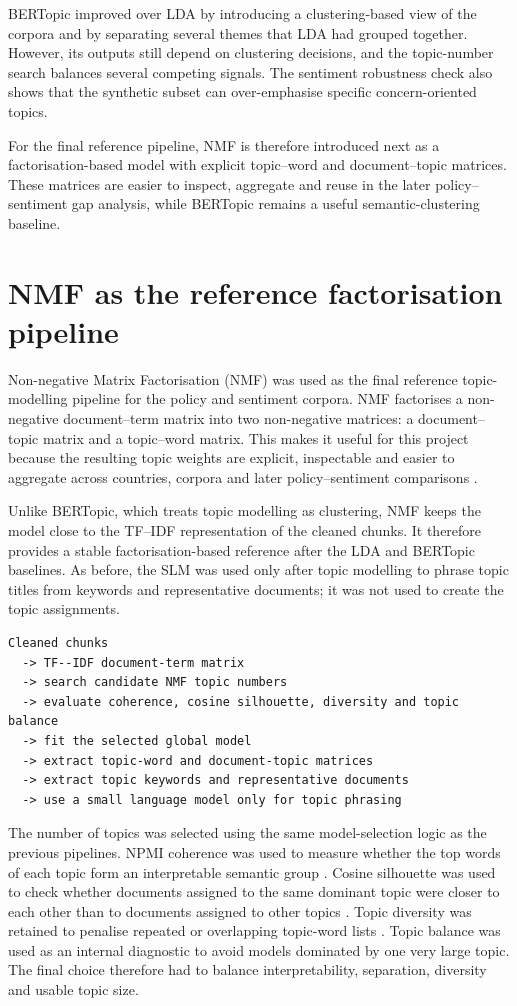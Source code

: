 \documentclass{article}
\begin{document}
BERTopic improved over LDA by introducing a clustering-based view of the corpora and
by separating several themes that LDA had grouped together. However, its outputs
still depend on clustering decisions, and the topic-number search balances several
competing signals. The sentiment robustness check also shows that the synthetic
subset can over-emphasise specific concern-oriented topics.

For the final reference pipeline, NMF is therefore introduced next as a
factorisation-based model with explicit topic--word and document--topic matrices.
These matrices are easier to inspect, aggregate and reuse in the later
policy--sentiment gap analysis, while BERTopic remains a useful semantic-clustering
baseline.


\section{NMF as the reference factorisation pipeline}

Non-negative Matrix Factorisation (NMF) was used as the final reference
topic-modelling pipeline for the policy and sentiment corpora. NMF factorises a
non-negative document--term matrix into two non-negative matrices: a document--topic
matrix and a topic--word matrix. This makes it useful for this project because the
resulting topic weights are explicit, inspectable and easier to aggregate across
countries, corpora and later policy--sentiment comparisons
\cite{lee1999learning,xu2003document}.

Unlike BERTopic, which treats topic modelling as clustering, NMF keeps the model
close to the TF--IDF representation of the cleaned chunks. It therefore provides a
stable factorisation-based reference after the LDA and BERTopic baselines. As before,
the SLM was used only after topic modelling to phrase topic titles from keywords and
representative documents; it was not used to create the topic assignments.

\begin{verbatim}
Cleaned chunks
  -> TF--IDF document-term matrix
  -> search candidate NMF topic numbers
  -> evaluate coherence, cosine silhouette, diversity and topic balance
  -> fit the selected global model
  -> extract topic-word and document-topic matrices
  -> extract topic keywords and representative documents
  -> use a small language model only for topic phrasing
\end{verbatim}

The number of topics was selected using the same model-selection logic as the
previous pipelines. NPMI coherence was used to measure whether the top words of each
topic form an interpretable semantic group \cite{roder2015exploring}. Cosine
silhouette was used to check whether documents assigned to the same dominant topic
were closer to each other than to documents assigned to other topics
\cite{rousseeuw1987silhouettes}. Topic diversity was retained to penalise repeated or
overlapping topic-word lists \cite{dieng2020topic}. Topic balance was used as an
internal diagnostic to avoid models dominated by one very large topic. The final
choice therefore had to balance interpretability, separation, diversity and usable
topic size.
\end{document}
